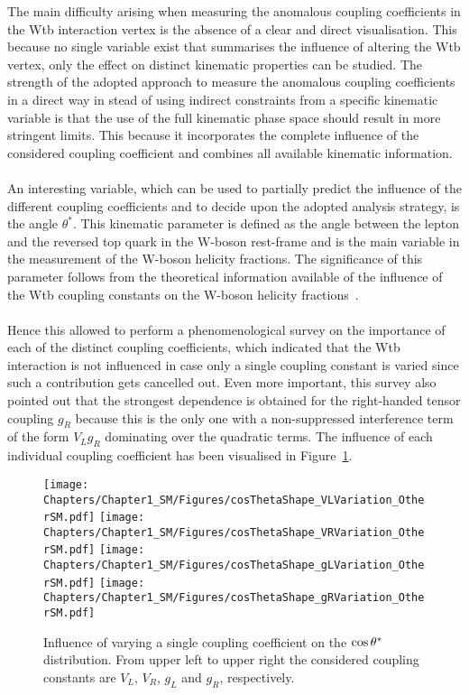 The main difficulty arising when measuring the anomalous coupling coefficients in the Wtb interaction vertex is the absence of a clear and direct visualisation.
This because no single variable exist that summarises the influence of altering the Wtb vertex, only the effect on distinct kinematic properties can be studied. %
The strength of the adopted approach to measure the anomalous coupling coefficients in a direct way in stead of using indirect constraints from a specific kinematic variable is that the use of the full kinematic phase space should result in more stringent limits.
This because it incorporates the complete influence of the considered coupling coefficient and combines all available kinematic information. 
\\
\\
An interesting variable, which can be used to partially predict the influence of the different coupling coefficients and to decide upon the adopted analysis strategy, is the angle $\theta^{*}$. This kinematic parameter is defined as the angle between the lepton and the reversed top quark in the W-boson rest-frame and is the main variable in the measurement of the W-boson helicity fractions. The significance of this parameter follows from the theoretical information available of the influence of the Wtb coupling constants on the W-boson helicity fractions~\cite{WidthLinkWtb}.
\\
\\
Hence this allowed to perform a phenomenological survey on the importance of each of the distinct coupling coefficients, which indicated that the Wtb interaction is not influenced in case only a single coupling constant is varied since such a contribution gets cancelled out. Even more important, this survey also pointed out that the strongest dependence is obtained for the right-handed tensor coupling $g_R$ because this is the only one with a non-suppressed interference term of the form $V_L g_R$ dominating over the quadratic terms. The influence of each individual coupling coefficient has been visualised in Figure~\ref{fig::CsThInfluence}.
\begin{figure}[h!t]
 \centering
 \texttt{[image: Chapters/Chapter1\_SM/Figures/cosThetaShape\_VLVariation\_OtherSM.pdf]}
 \texttt{[image: Chapters/Chapter1\_SM/Figures/cosThetaShape\_VRVariation\_OtherSM.pdf]}
 \texttt{[image: Chapters/Chapter1\_SM/Figures/cosThetaShape\_gLVariation\_OtherSM.pdf]}
 \texttt{[image: Chapters/Chapter1\_SM/Figures/cosThetaShape\_gRVariation\_OtherSM.pdf]}
 \caption{Influence of varying a single coupling coefficient on the $\cos \theta^{*}$ distribution. From upper left to upper right the considered coupling constants are $V_L$, $V_R$, $g_L$ and $g_R$, respectively.}
 \label{fig::CsThInfluence}
\end{figure}

